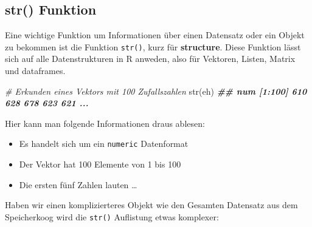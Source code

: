 \documentclass[
]{article}
\newenvironment{Shaded}{\begin{snugshade}}{\end{snugshade}}
\newcommand{\CommentTok}[1]{\textcolor[rgb]{0.56,0.35,0.01}{\textit{#1}}}
\newcommand{\DocumentationTok}[1]{\textcolor[rgb]{0.56,0.35,0.01}{\textbf{\textit{#1}}}}
\newcommand{\FunctionTok}[1]{\textcolor[rgb]{0.00,0.00,0.00}{#1}}
\newcommand{\NormalTok}[1]{#1}
\providecommand{\tightlist}{%
  \setlength{\itemsep}{0pt}\setlength{\parskip}{0pt}}
\begin{document}
\hypertarget{str-funktion}{%
\subsection{str() Funktion}\label{str-funktion}}

Eine wichtige Funktion um Informationen über einen Datensatz oder ein Objekt zu bekommen ist die Funktion \texttt{str()}, kurz für \textbf{structure}. Diese Funktion lässt sich auf alle Datenstrukturen in R anweden, also für Vektoren, Listen, Matrix und dataframes.

\begin{Shaded}
\begin{Highlighting}[]
\CommentTok{\# Erkunden eines Vektors mit 100 Zufallszahlen}
\FunctionTok{str}\NormalTok{(eh)}
\DocumentationTok{\#\#  num [1:100] 610 628 678 623 621 ...}
\end{Highlighting}
\end{Shaded}

Hier kann man folgende Informationen draus ablesen:

\begin{itemize}
\tightlist
\item
  Es handelt sich um ein \texttt{numeric} Datenformat
\item
  Der Vektor hat 100 Elemente von 1 bis 100
\item
  Die ersten fünf Zahlen lauten \ldots{}
\end{itemize}

Haben wir einen komplizierteres Objekt wie den Gesamten Datensatz aus dem Speicherkoog wird die \texttt{str()} Auflistung etwas komplexer:

\begin{Shaded}
\end{Shaded}
\end{document}
